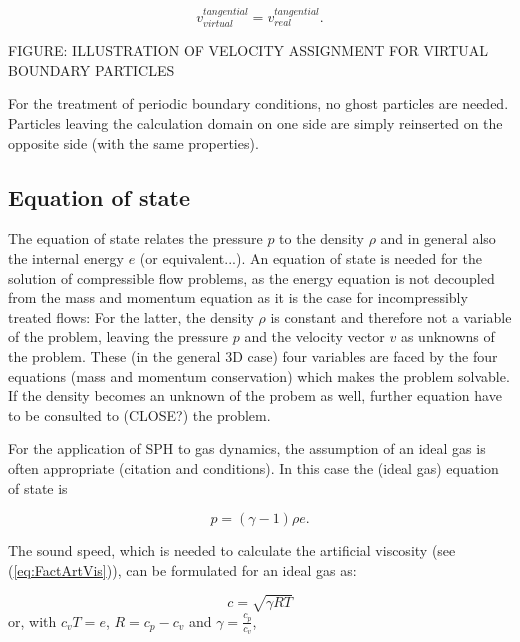 \documentclass{report}
\begin{document}
\begin{equation}
v_{virtual}^{tangential}=v_{real}^{tangential}.
\end{equation}

FIGURE: ILLUSTRATION OF VELOCITY ASSIGNMENT FOR VIRTUAL BOUNDARY PARTICLES

For the treatment of periodic boundary conditions, no ghost particles are
needed. Particles leaving the calculation domain on one side are simply
reinserted on the opposite side (with the same properties).


\subsection{Equation of state}


The equation of state relates the pressure $p$ 
to the density $\rho$ and in general also the internal energy $e$ (or equivalent...).
An equation of state is needed for the solution of compressible flow problems, as the energy equation is not decoupled from the mass and momentum equation as it is the case for incompressibly treated flows: For the latter, the density $\rho$ is constant and therefore not a variable of the problem, leaving the pressure $p$ and the velocity vector $v$ as unknowns of the problem. These (in the general 3D case) four variables are faced by the four equations (mass and momentum conservation) which makes the problem solvable. If the density becomes an unknown of the probem as well, further equation have to be consulted to (CLOSE?) the problem.  
 
 For the 
application of SPH to gas dynamics, the assumption of an ideal gas is often
appropriate (citation and conditions). In this case the (ideal gas) equation of state is



\begin{equation}
\label{eq:idealGasEqState}
 p=(\gamma-1)\rho e.
\end{equation}

The sound speed, which is needed to calculate the artificial viscosity (see (\ref{eq:FactArtVis})), can be formulated for an ideal gas as:

\begin{equation}
\label{eq:soundSpeed}
 c=\sqrt{\gamma R T}
\end{equation}
or, with $c_v T=e$, $R=c_p-c_v$ and $\gamma=\frac{c_p}{c_v}$,
\end{document}
